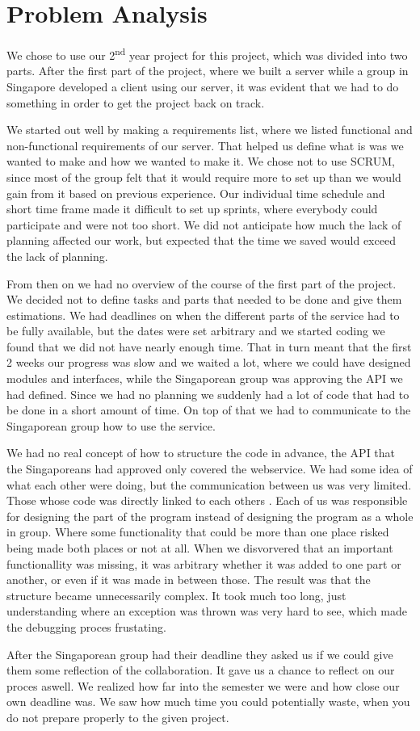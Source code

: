 \section{Problem Analysis}
We chose to use our 2\textsuperscript{nd} year project for this project, which was divided into two parts. After the first part of the project, where we built a server while a group in Singapore developed a client using our server, it was evident that we had to do something in order to get the project back on track.

We started out well by making a requirements list, where we listed functional and non-functional requirements of our server. That helped us define what is was we wanted to make and how we wanted to make it. We chose not to use SCRUM, since most of the group felt that it would require more to set up than we would gain from it based on previous experience. Our individual time schedule and short time frame made it difficult to set up sprints, where everybody could participate and were not too short. We did not anticipate how much the lack of planning affected our work, but expected that the time we saved would exceed the lack of planning.

From then on we had no overview of the course of the first part of the project. We decided not to define tasks and parts that needed to be done and give them estimations. We had deadlines on when the different parts of the service had to be fully available, but the dates were set arbitrary and we started coding we found that we did not have nearly enough time. That in turn meant that the first 2 weeks our progress was slow and we waited a lot, where we could have designed modules and interfaces, while the Singaporean group was approving the API we had defined. Since we had no planning we suddenly had a lot of code that had to be done in a short amount of time. On top of that we had to communicate to the Singaporean group how to use the service.
 
We had no real concept of how to structure the code in advance, the API that the Singaporeans had approved only covered the webservice. We had some idea of what each other were doing, but the communication between us was very limited. Those whose code was directly linked to each others . Each of us was responsible for designing the part of the program instead of designing the program as a whole in group. Where some functionality that could be more than one place risked being made both places or not at all. When we disvorvered that an important functionallity was missing, it was arbitrary whether it was added to one part or another, or even if it was made in between those. The result was that the structure became unnecessarily complex. It took much too long, just understanding where an exception was thrown was very hard to see, which made the debugging proces frustating.

After the Singaporean group had their deadline they asked us if we could give them some reflection of the collaboration. It gave us a chance to reflect on our proces aswell. We realized how far into the semester we were and how close our own deadline was. We saw how much time you could potentially waste, when you do not prepare properly to the given project.
\newpage